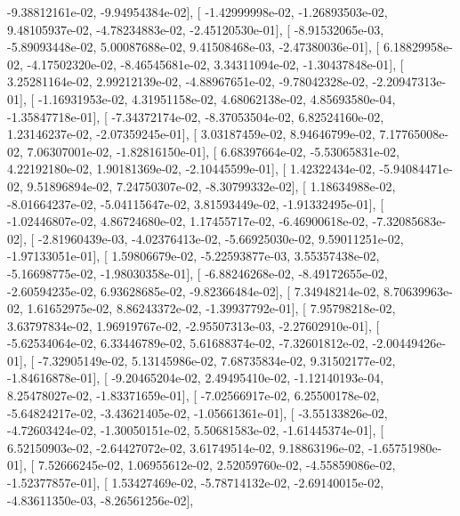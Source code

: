 \documentclass{article}
\begin{document}
         -9.38812161e-02,  -9.94954384e-02],
       [ -1.42999998e-02,  -1.26893503e-02,   9.48105937e-02,
         -4.78234883e-02,  -2.45120530e-01],
       [ -8.91532065e-03,  -5.89093448e-02,   5.00087688e-02,
          9.41508468e-03,  -2.47380036e-01],
       [  6.18829958e-02,  -4.17502320e-02,  -8.46545681e-02,
          3.34311094e-02,  -1.30437848e-01],
       [  3.25281164e-02,   2.99212139e-02,  -4.88967651e-02,
         -9.78042328e-02,  -2.20947313e-01],
       [ -1.16931953e-02,   4.31951158e-02,   4.68062138e-02,
          4.85693580e-04,  -1.35847718e-01],
       [ -7.34372174e-02,  -8.37053504e-02,   6.82524160e-02,
          1.23146237e-02,  -2.07359245e-01],
       [  3.03187459e-02,   8.94646799e-02,   7.17765008e-02,
          7.06307001e-02,  -1.82816150e-01],
       [  6.68397664e-02,  -5.53065831e-02,   4.22192180e-02,
          1.90181369e-02,  -2.10445599e-01],
       [  1.42322434e-02,  -5.94084471e-02,   9.51896894e-02,
          7.24750307e-02,  -8.30799332e-02],
       [  1.18634988e-02,  -8.01664237e-02,  -5.04115647e-02,
          3.81593449e-02,  -1.91332495e-01],
       [ -1.02446807e-02,   4.86724680e-02,   1.17455717e-02,
         -6.46900618e-02,  -7.32085683e-02],
       [ -2.81960439e-03,  -4.02376413e-02,  -5.66925030e-02,
          9.59011251e-02,  -1.97133051e-01],
       [  1.59806679e-02,  -5.22593877e-03,   3.55357438e-02,
         -5.16698775e-02,  -1.98030358e-01],
       [ -6.88246268e-02,  -8.49172655e-02,  -2.60594235e-02,
          6.93628685e-02,  -9.82366484e-02],
       [  7.34948214e-02,   8.70639963e-02,   1.61652975e-02,
          8.86243372e-02,  -1.39937792e-01],
       [  7.95798218e-02,   3.63797834e-02,   1.96919767e-02,
         -2.95507313e-03,  -2.27602910e-01],
       [ -5.62534064e-02,   6.33446789e-02,   5.61688374e-02,
         -7.32601812e-02,  -2.00449426e-01],
       [ -7.32905149e-02,   5.13145986e-02,   7.68735834e-02,
          9.31502177e-02,  -1.84616878e-01],
       [ -9.20465204e-02,   2.49495410e-02,  -1.12140193e-04,
          8.25478027e-02,  -1.83371659e-01],
       [ -7.02566917e-02,   6.25500178e-02,  -5.64824217e-02,
         -3.43621405e-02,  -1.05661361e-01],
       [ -3.55133826e-02,  -4.72603424e-02,  -1.30050151e-02,
          5.50681583e-02,  -1.61445374e-01],
       [  6.52150903e-02,  -2.64427072e-02,   3.61749514e-02,
          9.18863196e-02,  -1.65751980e-01],
       [  7.52666245e-02,   1.06955612e-02,   2.52059760e-02,
         -4.55859086e-02,  -1.52377857e-01],
       [  1.53427469e-02,  -5.78714132e-02,  -2.69140015e-02,
         -4.83611350e-03,  -8.26561256e-02],
\end{document}
